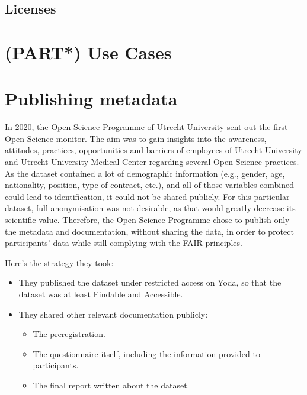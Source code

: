 \documentclass[
]{book}
\providecommand{\tightlist}{%
  \setlength{\itemsep}{0pt}\setlength{\parskip}{0pt}}
\begin{document}
\hypertarget{licenses}{%
\section{Licenses}\label{licenses}}

\hypertarget{part-use-cases}{%
\chapter{(PART*) Use Cases}\label{part-use-cases}}

\hypertarget{open-science-questionnaire}{%
\chapter{Publishing metadata}\label{open-science-questionnaire}}

In 2020, the
Open
Science Programme of Utrecht University sent out the first
Open Science monitor. The aim was to gain insights into the awareness,
attitudes, practices, opportunities and barriers of employees of Utrecht
University and Utrecht University Medical Center regarding several Open
Science practices. As the dataset contained a lot of demographic information
(e.g., gender, age, nationality, position, type of contract, etc.), and all of
those variables combined could lead to identification, it could not be shared
publicly. For this particular dataset, full anonymisation was not desirable,
as that would greatly decrease its scientific value. Therefore, the Open Science
Programme chose to publish only the metadata and documentation, without sharing
the data, in order to protect participants' data while still complying with the
FAIR principles.

Here's the strategy they took:

\begin{itemize}
\tightlist
\item
  They published the dataset under
  restricted
  access on Yoda, so that the dataset was at least Findable and Accessible.
\item
  They shared other relevant documentation publicly:

  \begin{itemize}
  \tightlist
  \item
    The preregistration.
  \item
    The questionnaire itself,
    including the information provided to participants.
  \item
    The final report
    written about the dataset.
  \end{itemize}
\end{itemize}
\end{document}
